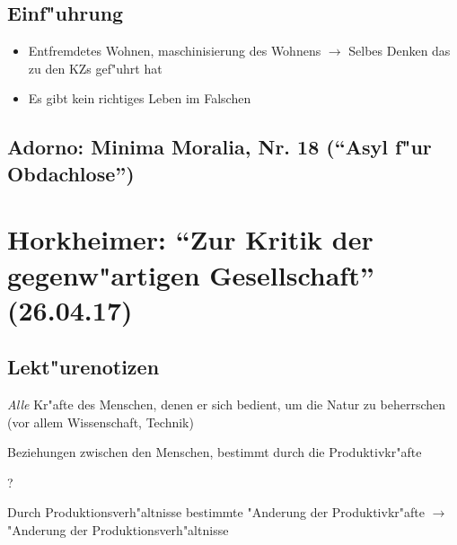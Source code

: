 \documentclass[emulatestandardclasses]{scrartcl}
\begin{document}
\subsection{Einf"uhrung}

\begin{itemize}
  \item Entfremdetes Wohnen, maschinisierung des Wohnens $\rightarrow$ Selbes Denken das zu den KZs gef"uhrt hat
  \item Es gibt kein richtiges Leben im Falschen
\end{itemize}

\subsection{Adorno: Minima Moralia, Nr. 18 ("`Asyl f"ur Obdachlose"')}



\section{Horkheimer: "`Zur Kritik der gegenw"artigen Gesellschaft"'
\\(26.04.17)}

\subsection{Lekt"urenotizen}

\begin{description}[leftmargin=!,labelwidth=\widthof{\bfseries Dialektischer Materialismus}]
  \item[Produktivkr"afte] \emph{Alle} Kr"afte des Menschen, denen er sich bedient, um die Natur zu beherrschen (vor allem Wissenschaft, Technik)
  \item[Produktionsverh"altnisse] Beziehungen zwischen den Menschen, bestimmt durch die Produktivkr"afte 
  \item[Dialektik] ?
  \item[Dialektischer Materialismus] Durch Produktionsverh"altnisse bestimmte "Anderung der Produktivkr"afte $\rightarrow$ "Anderung der Produktionsverh"altnisse
\end{description}
\end{document}
